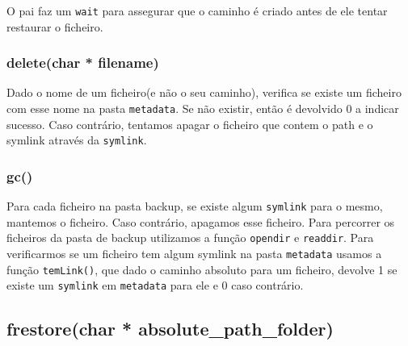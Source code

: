 O pai faz um \texttt{wait} para assegurar que o caminho é criado antes de ele tentar restaurar o ficheiro.

\subsubsection{delete(char * filename)}
Dado o nome de um ficheiro(e não o seu caminho), verifica se existe um ficheiro com esse nome na pasta \texttt{metadata}. Se não existir, então é
devolvido 0 a indicar sucesso. Caso contrário, tentamos apagar o ficheiro que contem o path e o symlink através da \texttt{symlink}.

\subsubsection{gc()}
Para cada ficheiro na pasta backup, se existe algum \texttt{symlink} para o mesmo, mantemos o ficheiro. Caso contrário, apagamos esse ficheiro.
Para percorrer os ficheiros da pasta de backup utilizamos a função \texttt{opendir} e \texttt{readdir}. Para verificarmos se um ficheiro tem algum symlink
na pasta \texttt{metadata} usamos a função \texttt{temLink()}, que dado o caminho absoluto para um ficheiro, devolve 1 se existe um \texttt{symlink} em \texttt{metadata} para ele e 0 caso contrário.

\subsection{frestore(char * absolute_path_folder)}
